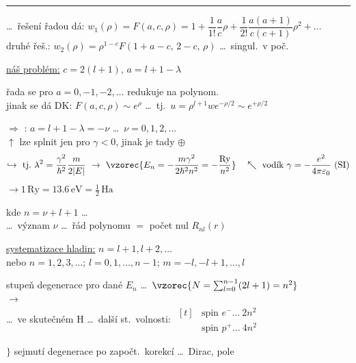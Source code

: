 \rule{\linewidth}{0.3pt}
\dots\ řešení řadou dá: \quad $w_1(\rho) = F(a,c,\rho) = 1 + \dfrac{1}{1!}\dfrac{a}{c}\rho + \dfrac{1}{2!}\dfrac{a(a+1)}{c(c+1)}\rho^2 + \dots$ \\
\hspace*{2.5cm} druhé řeš.: \quad $w_2(\rho) = \rho^{1-c}F(1+a-c,\,2-c,\,\rho)$ \dots\ singul.\ v poč.

\underline{náš problém:} \quad $c = 2(l+1)$, \quad $a = l + 1 - \lambda$

řada se pro $a = 0,-1,-2,\dots$ redukuje na polynom. \\
jinak se dá DK: \quad $F(a,c,\rho)\sim e^\rho$ \dots\ tj.\ $u = \rho^{l+1}we^{-\rho/2}\sim e^{+\rho/2}$ \ 

$\Rightarrow$ : \quad $a = l + 1 - \lambda = -\nu$ \quad \dots\ $\nu = 0,1,2,\dots$ \\
\hspace*{6.5cm} $\uparrow$ lze splnit jen pro $\gamma < 0$, jinak je tady $\oplus$
\[
  \hookrightarrow\ \text{tj.}\ \lambda^2 = \frac{\gamma^2}{\hbar^2}\frac{m}{2|E|}
  \ \to\ \vzorec{E_n = -\frac{m\gamma^2}{2\hbar^2n^2} = -\frac{\mathrm{Ry}}{n^2}}
  \quad\nwarrow\ \text{vodík } \gamma = -\frac{e^2}{4\pi\varepsilon_0}\ (\mathrm{SI})
\]
\hspace*{11cm} $\to 1\,\mathrm{Ry} = 13.6\,\mathrm{eV} = \frac12\,\mathrm{Ha}$

\quad kde \quad $n = \nu + l + 1$ \quad \dots\  \\
\quad\quad \dots\ význam $\nu$ \dots\ řád polynomu $=$ počet nul $R_{nl}(r)$ 

\underline{systematizace hladin:} \quad $n = l+1, l+2,\dots$ \\
\quad nebo \quad $n = 1,2,3,\dots$; \quad $l = 0,1,\dots,n-1$; \quad $m = -l,-l+1,\dots,l$

\begin{minipage}{0.75\textwidth}
stupeň degenerace pro dané $E_n$ \dots\ $\vzorec{N = \sum_{l=0}^{n-1}(2l+1) = n^2}$ \\
$\to$  \\
\quad \dots\ ve skutečném H \dots\ další st.\ volnosti: \quad
$\begin{aligned}[t] &\text{spin } e^- \dots\ 2n^2 \\ &\text{spin } p^+ \dots\ 4n^2\end{aligned}$
\end{minipage}
\begin{minipage}{0.23\textwidth}
$\Bigg\}$ \small sejmutí degenerace po započt.\ korekcí \dots\ Dirac, pole
\end{minipage}

